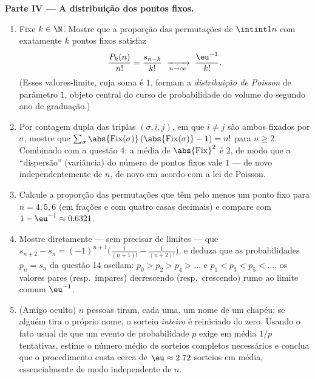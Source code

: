 \begin{problem}
\medskip
\noindent\textbf{Parte IV --- A distribuição dos pontos fixos.}
\begin{enumerate}
  \item Fixe $k \in \N$. Mostre que a proporção das permutações
        de $\intint1n$ com exatamente $k$ pontos fixos satisfaz
        \[
        \frac{P_k(n)}{n!} = \frac{s_{n-k}}{k!}
        \;\xrightarrow[n \to \infty]{}\; \frac{\eu^{-1}}{k!} .
        \]
        (Esses valores-limite, cuja soma é $1$, formam a
        \emph{distribuição de Poisson} de parâmetro $1$, objeto
        central do curso de probabilidade do volume do segundo ano de
        graduação.)
  \item Por contagem dupla das triplas $(\sigma, i, j)$, em que $i
        \neq j$ são ambos fixados por $\sigma$, mostre que
        $\sum_\sigma \abs{\mathrm{Fix}(\sigma)}\,
        (\abs{\mathrm{Fix}(\sigma)} - 1) = n!$ para $n \geq 2$.
        Combinado com a questão 4: a média de
        $\abs{\mathrm{Fix}}^2$ é $2$, de modo que a ``dispersão'' (variância)
        do número de pontos fixos vale $1$ --- de novo
        independentemente de $n$, de novo em acordo com a lei de Poisson.
  \item Calcule a proporção das permutações que têm pelo menos um
        ponto fixo para $n = 4, 5, 6$ (em frações e com quatro
        casas decimais) e compare com $1 - \eu^{-1} \approx
        0.6321$.
  \item Mostre diretamente --- sem precisar de limites --- que $s_{n+2} - s_n
        = (-1)^{n+1}\bigl(\frac1{(n+1)!} - \frac1{(n+2)!}\bigr)$,
        e deduza que as probabilidades $p_n = s_n$ da
        questão 14 oscilam: $p_0 > p_2 > p_4 > \dots$ e
        $p_1 < p_3 < p_5 < \dots$, os valores pares (resp.\ ímpares)
        decrescendo (resp.\ crescendo) rumo ao limite comum
        $\eu^{-1}$.
  \item (Amigo oculto) $n$ pessoas tiram, cada uma, um nome de um
        chapéu; se alguém tira o próprio nome, o sorteio \emph{inteiro}
        é reiniciado do zero. Usando o fato usual de que um evento de
        probabilidade $p$ exige em média $1/p$ tentativas,
        estime o número médio de sorteios completos necessários e
        conclua que o procedimento custa cerca de $\eu \approx
        2.72$ sorteios em média, essencialmente de modo independente
        de $n$.
\end{enumerate}


\end{problem}
